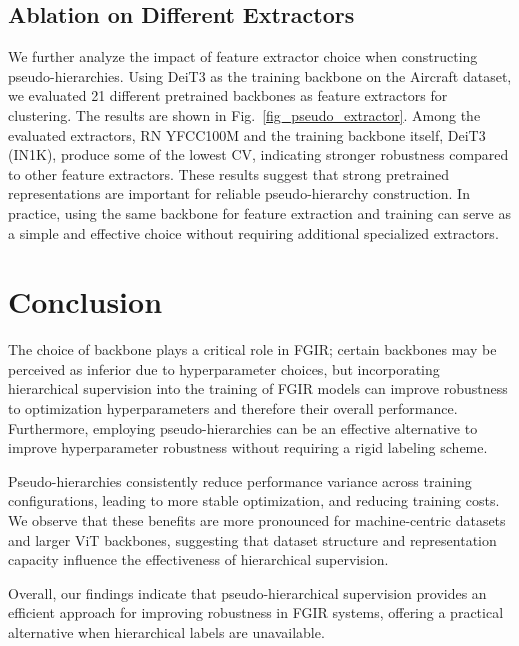 \documentclass[10pt,twocolumn,letterpaper]{article}
\begin{document}
\subsection{Ablation on Different Extractors}
We further analyze the impact of feature extractor choice when constructing pseudo-hierarchies. Using DeiT3 as the training backbone on the Aircraft dataset, we evaluated 21 different pretrained backbones as feature extractors for clustering. The results are shown in Fig.~\ref{fig_pseudo_extractor}. Among the evaluated extractors, RN YFCC100M and the training backbone itself, DeiT3 (IN1K), produce some of the lowest CV, indicating stronger robustness compared to other feature extractors. These results suggest that strong pretrained representations are important for reliable pseudo-hierarchy construction. In practice, using the same backbone for feature extraction and training can serve as a simple and effective choice without requiring additional specialized extractors.

%     
% 
% 
% 



\section{Conclusion}
\label{sec_conclusion}

The choice of backbone plays a critical role in FGIR; certain backbones may be perceived as inferior due to hyperparameter choices, but incorporating hierarchical supervision into the training of FGIR models can improve robustness to optimization hyperparameters and therefore their overall performance. Furthermore, employing pseudo-hierarchies can be an effective alternative to improve hyperparameter robustness without requiring a rigid labeling scheme. 

Pseudo-hierarchies consistently reduce performance variance across training configurations, leading to more stable optimization, and reducing training costs. We observe that these benefits are more pronounced for machine-centric datasets and larger ViT backbones, suggesting that dataset structure and representation capacity influence the effectiveness of hierarchical supervision.

Overall, our findings indicate that pseudo-hierarchical supervision provides an efficient approach for improving robustness in FGIR systems, offering a practical alternative when hierarchical labels are unavailable.
\end{document}
